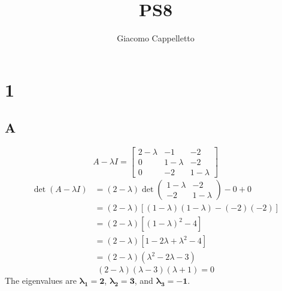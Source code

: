 \documentclass{article}
\title{PS8}
\author{Giacomo Cappelletto}
\newcommand{\mat}[1]{\begin{bmatrix} #1 \end{bmatrix}}
\begin{document}
\maketitle

\section*{1}
\subsection*{A}


\[
	A - \lambda I = \mat{ 2 - \lambda & -1 & -2 \\ 0 & 1 - \lambda & -2 \\ 0 & -2 & 1 - \lambda }
\]
\[
	\begin{aligned}
		\det(A - \lambda I) & = (2 - \lambda) \det \begin{pmatrix} 1 - \lambda & -2 \\ -2 & 1 - \lambda \end{pmatrix} - 0 + 0 \\
		                    & = (2 - \lambda) \left[ (1 - \lambda)(1 - \lambda) - (-2)(-2) \right]                            \\
		                    & = (2 - \lambda) \left[ (1 - \lambda)^2 - 4 \right]                                              \\
		                    & = (2 - \lambda) \left[ 1 - 2\lambda + \lambda^2 - 4 \right]                                     \\
		                    & = (2 - \lambda) (\lambda^2 - 2\lambda - 3)
	\end{aligned}
\]
\[
	(2 - \lambda)(\lambda - 3)(\lambda + 1) = 0
\]
The eigenvalues are $\mathbf{\lambda_1 = 2}$, $\mathbf{\lambda_2 = 3}$, and $\mathbf{\lambda_3 = -1}$.
\end{document}
